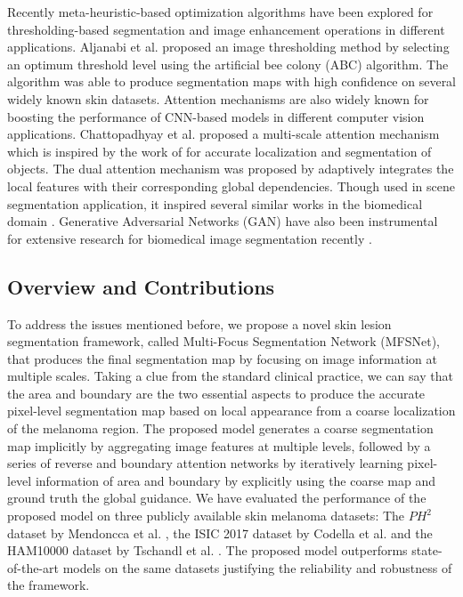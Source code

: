 \documentclass[review]{elsarticle}
\begin{document}
Recently meta-heuristic-based optimization algorithms have been explored for thresholding-based segmentation and image enhancement operations in different applications. Aljanabi et al. \cite{aljanabi2018skin} proposed an image thresholding method by selecting an optimum threshold level using the artificial bee colony (ABC) algorithm. The algorithm was able to produce segmentation maps with high confidence on several widely known skin datasets. Attention mechanisms are also widely known for boosting the performance of CNN-based models in different computer vision applications. Chattopadhyay et al. \cite{chattopadhyay2020multi} proposed a multi-scale attention mechanism which is inspired by the work of \cite{bi2020multi} for accurate localization and segmentation of objects. The dual attention mechanism was proposed by \cite{fu2019dual} adaptively integrates the local features with their corresponding global dependencies. Though used in scene segmentation application, it inspired several similar works in the biomedical domain \cite{barata2021explainable}. Generative Adversarial Networks (GAN) have also been instrumental for extensive research for biomedical image segmentation recently \cite{lei2020skin}.


\subsection{Overview and Contributions}
To address the issues mentioned before, we propose a novel skin lesion segmentation framework, called Multi-Focus Segmentation Network (MFSNet), that produces the final segmentation map by focusing on image information at multiple scales. Taking a clue from the standard clinical practice, we can say that the area and boundary are the two essential aspects to produce the accurate pixel-level segmentation map based on local appearance from a coarse localization of the melanoma region. The proposed model generates a coarse segmentation map implicitly by aggregating image features at multiple levels, followed by a series of reverse and boundary attention networks by iteratively learning pixel-level information of area and boundary by explicitly using the coarse map and ground truth the global guidance. We have evaluated the performance of the proposed model on three publicly available skin melanoma datasets: The $PH^2$ dataset by Mendoncca et al. \cite{mendoncca2013ph}, the ISIC 2017 dataset by Codella et al. \cite{codella2018skin} and the HAM10000 dataset by Tschandl et al. \cite{tschandl2018ham10000}. The proposed model outperforms state-of-the-art models on the same datasets justifying the reliability and robustness of the framework.
\end{document}
